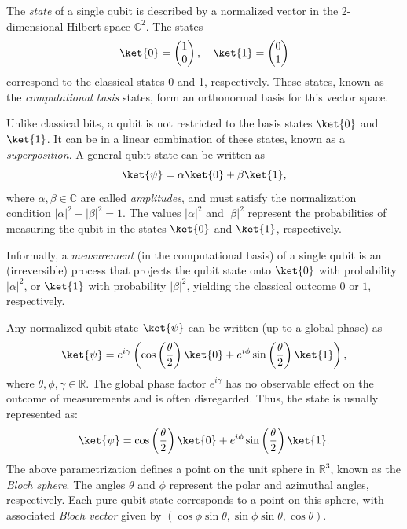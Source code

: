 \begin{definition}
  The \emph{state} of a single qubit is described by a normalized vector in the 2-dimensional Hilbert space \( \mathbb{C}^{2} \). The states 
  \[
  \ket{0} = \begin{pmatrix} 1\\0 \end{pmatrix}, \quad \ket{1} =   \begin{pmatrix} 0\\1 \end{pmatrix}
  \]
  correspond to the classical states 0 and 1, respectively. These states, known as the \emph{computational basis} states, form an orthonormal basis for this vector space.
\end{definition}

\begin{definition}
  Unlike classical bits, a qubit is not restricted to the basis states \( \ket{0} \) and \( \ket{1} \). It can be in a linear combination of these states, known as a \emph{superposition}. A general qubit state can be written as
  \[
  \ket{\psi} = \alpha \ket{0} + \beta \ket{1},
  \]
  where \( \alpha, \beta \in \mathbb{C} \) are called \emph{amplitudes}, and must satisfy the normalization condition \( |\alpha|^2 + |\beta|^2 = 1 \). The values \( |\alpha|^2 \) and \( |\beta|^2 \) represent the probabilities of measuring the qubit in the states \( \ket{0} \) and \( \ket{1} \), respectively.
\end{definition}


  Informally, a \emph{measurement} (in the computational basis) of a single qubit is an (irreversible) process that projects the qubit state onto \( \ket{0} \) with probability \( |\alpha|^2 \), or \( \ket{1} \) with probability \( |\beta|^2 \), yielding the classical outcome \( 0 \) or \( 1 \), respectively.

  Any normalized qubit state \( \ket{\psi} \) can be written (up to a global phase) as
  \[
  \ket{\psi} = e^{i \gamma} \left(\cos\left(\frac{\theta}{2}\right) \ket{0} + e^{i\phi}\sin\left(\frac{\theta}{2}\right)\ket{1}\right),
  \]
  where \( \theta, \phi, \gamma \in \mathbb{R} \). The global phase factor \( e^{i \gamma} \) has no observable effect on the outcome of measurements  and is often disregarded. Thus, the state is usually represented as:
  \begin{equation} \label{eq:qubit3}
  \ket{\psi} = \cos\left(\frac{\theta}{2}\right) \ket{0} + e^{i\phi}\sin\left(\frac{\theta}{2}\right)\ket{1}.
  \end{equation}
  The above parametrization defines a point on the unit sphere in \( \mathbb{R}^3 \), known as the \emph{Bloch sphere}. The angles \( \theta \) and \( \phi \) represent the polar and azimuthal angles, respectively. Each pure qubit state corresponds to a point on this sphere, with associated \emph{Bloch vector} given by
  $(\cos \phi \sin \theta, \sin \phi \sin \theta, \cos \theta).$

